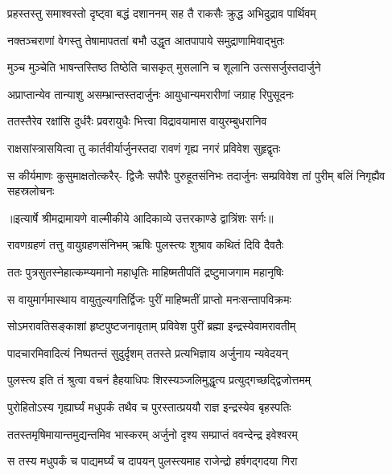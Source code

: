 \twolineshloka
{प्रहस्तस्तु समाश्वस्तो दृष्ट्वा बद्धं दशाननम्}
{सह तै राकसैः क्रुद्ध अभिदुद्राव पार्थिवम्} %

\twolineshloka
{नक्तञ्चराणां वेगस्तु तेषामापततां बभौ}
{उद्धृत आतपापाये समुद्राणामिवाद्भुतः} %

\twolineshloka
{मुञ्च मुञ्चेति भाषन्तस्तिष्ठ तिष्ठेति चासकृत्}
{मुसलानि च शूलानि उत्ससर्जुस्तदार्जुने} %

\twolineshloka
{अप्राप्तान्येव तान्याशु असम्भ्रान्तस्तदार्जुनः}
{आयुधान्यमरारीणां जग्राह रिपुसूदनः} %

\twolineshloka
{ततस्तैरेव रक्षांसि दुर्धरैः प्रवरायुधैः}
{भित्त्वा विद्रावयामास वायुरम्बुधरानिव} %

\twolineshloka
{राक्षसांस्त्रासयित्वा तु कार्तवीर्यार्जुनस्तदा}
{रावणं गृह्य नगरं प्रविवेश सुहृद्वृतः} %

\fourlineindentedshloka
{स कीर्यमाणः कुसुमाक्षतोत्करैर्-}
{द्विजैः सपौरैः पुरुहूतसंनिभः}
{तदार्जुनः सम्प्रविवेश तां पुरीम्}
{बलिं निगृह्यैव सहस्रलोचनः} %


{॥इत्यार्षे श्रीमद्रामायणे वाल्मीकीये आदिकाव्ये उत्तरकाण्डे द्वात्रिंशः सर्गः॥}


\twolineshloka
{रावणग्रहणं तत्तु वायुग्रहणसंनिभम्}
{ऋषिः पुलस्त्यः शुश्राव कथितं दिवि दैवतैः} %

\twolineshloka
{ततः पुत्रसुतस्नेहात्कम्प्यमानो महाधृतिः}
{माहिष्मतीपतिं द्रष्टुमाजगाम महानृषिः} %

\twolineshloka
{स वायुमार्गमास्थाय वायुतुल्यगतिर्द्विजः}
{पुरीं माहिष्मतीं प्राप्तो मनःसन्तापविक्रमः} %

\twolineshloka
{सोऽमरावतिसङ्काशां हृष्टपुष्टजनावृताम्}
{प्रविवेश पुरीं ब्रह्मा इन्द्रस्येवामरावतीम्} %

\twolineshloka
{पादचारमिवादित्यं निष्पतन्तं सुदुर्दृशम्}
{ततस्ते प्रत्यभिज्ञाय अर्जुनाय न्यवेदयन्} %

\twolineshloka
{पुलस्त्य इति तं श्रुत्वा वचनं हैहयाधिपः}
{शिरस्यञ्जलिमुद्धृत्य प्रत्युद्गच्छद्द्विजोत्तमम्} %

\twolineshloka
{पुरोहितोऽस्य गृह्यार्घ्यं मधुपर्कं तथैव च}
{पुरस्तात्प्रययौ राज्ञ इन्द्रस्येव बृहस्पतिः} %

\twolineshloka
{ततस्तमृषिमायान्तमुद्यन्तमिव भास्करम्}
{अर्जुनो दृश्य सम्प्राप्तं ववन्देन्द्र इवेश्वरम्} %

\twolineshloka
{स तस्य मधुपर्कं च पाद्यमर्घ्यं च दापयन्}
{पुलस्त्यमाह राजेन्द्रो हर्षगद्गदया गिरा} %

